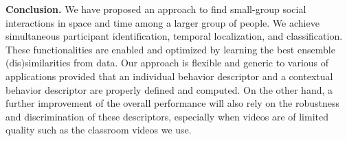 \documentclass[10pt,twocolumn,letterpaper]{article}
\begin{document}
\vspace{0.05in}

\noindent\textbf{Conclusion.} We have proposed an approach to find small-group social interactions in space and time among a larger group of people. We achieve simultaneous participant identification, temporal localization, and classification. These functionalities are enabled and optimized by learning the best ensemble (dis)similarities from data. Our approach is flexible and generic to various of applications provided that an individual behavior descriptor and a contextual behavior descriptor are properly defined and computed. On the other hand, a further improvement of the overall performance will also rely on the robustness and discrimination of these descriptors, especially when videos are of limited quality such as the classroom videos we use. 


{\footnotesize

}
\end{document}
